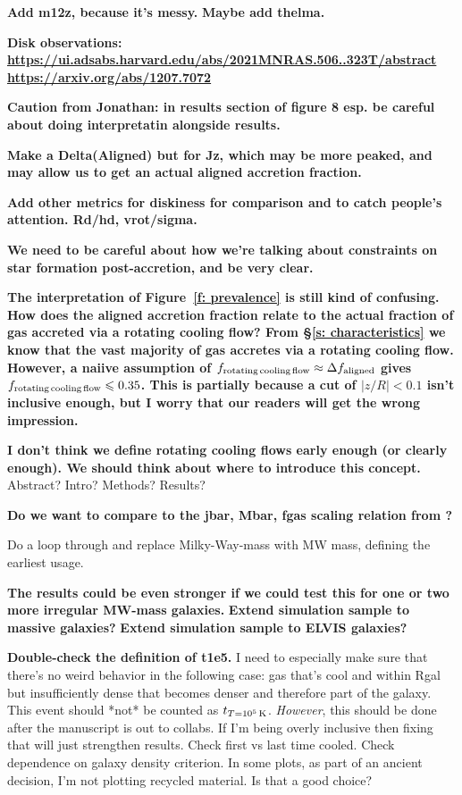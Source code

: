 \documentclass[fleqn,usenatbib]{mnras}
\newcommand{\tcon}{t_{T=10^5\,{\rm K}}}
\begin{document}
\textbf{Add m12z, because it's messy.}
\textbf{Maybe add thelma.}

\textbf{Disk observations:
\url{https://ui.adsabs.harvard.edu/abs/2021MNRAS.506..323T/abstract}
\url{https://arxiv.org/abs/1207.7072}
}

\textbf{
Caution from Jonathan: in results section of figure 8 esp. be careful about doing interpretatin alongside results.
}

\textbf{
Make a Delta(Aligned) but for Jz, which may be more peaked, and may allow us to get an actual aligned accretion fraction.
}

\textbf{Add other metrics for diskiness for comparison and to catch people's attention.
Rd/hd, vrot/sigma.
}

\textbf{
We need to be careful about how we're talking about constraints on star formation post-accretion, and be very clear.
}

\textbf{
The interpretation of Figure~\ref{f: prevalence} is still kind of confusing.
How does the aligned accretion fraction relate to the actual fraction of gas accreted via a rotating cooling flow?
From \S\ref{s: characteristics} we know that the vast majority of gas accretes via a rotating cooling flow.
However, a naiive assumption of $f_{\rm rotating\,cooling\,flow} \approx \Delta f_{\rm aligned}$ gives $f_{\rm rotating\,cooling\,flow} \le 0.35$.
This is partially because a cut of $\vert z/R\vert < 0.1$ isn't inclusive enough, but I worry that our readers will get the wrong impression.
}

\textbf{
I don't think we define rotating cooling flows early enough (or clearly enough).
We should think about where to introduce this concept.
}
Abstract?
Intro?
Methods?
Results?

\textbf{Do we want to compare to the jbar, Mbar, fgas scaling relation from \cite{Pina2021}?}

Do a loop through and replace Milky-Way-mass with MW mass, defining the earliest usage.

\textbf{The results could be even stronger if we could test this for one or two more irregular MW-mass galaxies.}
\textbf{Extend simulation sample to massive galaxies?}
\textbf{Extend simulation sample to ELVIS galaxies?}

\textbf{Double-check the definition of t1e5.}
I need to especially make sure that there's no weird behavior in the following case:
gas that's cool and within Rgal but insufficiently dense that becomes denser and therefore part of the galaxy.
This event should *not* be counted as $\tcon$.
\textit{However}, this should be done after the manuscript is out to collabs.
If I'm being overly inclusive then fixing that will just strengthen results.
Check first vs last time cooled.
Check dependence on galaxy density criterion.
In some plots, as part of an ancient decision, I'm not plotting recycled material.
Is that a good choice?
\end{document}

